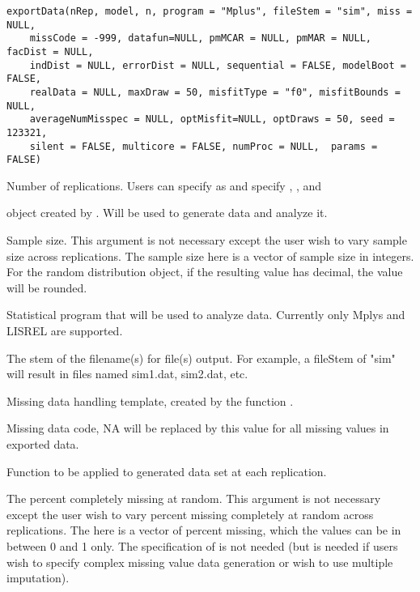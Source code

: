 \documentclass[a4paper]{book}
\begin{document}
%
\begin{Usage}
\begin{verbatim}
exportData(nRep, model, n, program = "Mplus", fileStem = "sim", miss = NULL, 
	missCode = -999, datafun=NULL, pmMCAR = NULL, pmMAR = NULL, facDist = NULL, 
	indDist = NULL, errorDist = NULL, sequential = FALSE, modelBoot = FALSE, 
	realData = NULL, maxDraw = 50, misfitType = "f0", misfitBounds = NULL, 
	averageNumMisspec = NULL, optMisfit=NULL, optDraws = 50, seed = 123321, 
	silent = FALSE, multicore = FALSE, numProc = NULL,  params = FALSE)
\end{verbatim}
\end{Usage}
%
\begin{Arguments}
\begin{ldescription}
\item[\code{nRep}] 
Number of replications. Users can specify as  and specify , , and 

\item[\code{model}] 
 object created by . Will be used to generate data and analyze it.

\item[\code{n}] 
Sample size. This argument is not necessary except the user wish to vary sample size across replications. The sample size here is a vector of sample size in integers. For the random distribution object, if the resulting value has decimal, the value will be rounded. 

\item[\code{program}] 
Statistical program that will be used to analyze data. Currently only Mplys and LISREL are supported.

\item[\code{fileStem}] 
The stem of the filename(s) for file(s) output. For example, a fileStem of "sim" will result in files named sim1.dat, sim2.dat, etc.

\item[\code{miss}] 
Missing data handling template, created by the function .

\item[\code{missCode}] 
Missing data code, NA will be replaced by this value for all missing values in exported data.

\item[\code{datafun}] 
Function to be applied to generated data set at each replication.

\item[\code{pmMCAR}] 
The percent completely missing at random. This argument is not necessary except the user wish to vary percent missing completely at random across replications. The  here is a vector of percent missing, which the values can be in between 0 and 1 only. The specification of  is not needed (but is needed if users wish to specify complex missing value data generation or wish to use multiple imputation). 


\end{ldescription}
\end{Arguments}
\end{document}
